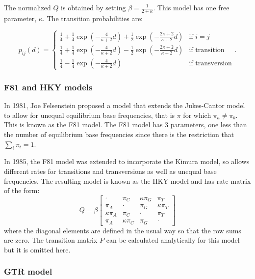 \documentclass[11pt]{article}
\begin{document}
The normalized $Q$ is obtained by setting $\beta = \frac{1}{2+\kappa}$. This model has one free parameter, $\kappa$. The transition probabilities are:

\begin{equation*}
p_{ij}(d) =  \begin{cases}
\frac{1}{4} + \frac{1}{4} \exp(-\frac{4}{\kappa+2}d) + \frac{1}{2}\exp(-\frac{2\kappa+2}{\kappa+2}d) & \text{if } i=j\\
\frac{1}{4} + \frac{1}{4} \exp(-\frac{4}{\kappa+2}d) - \frac{1}{2}\exp(-\frac{2\kappa+2}{\kappa+2}d)  &  \text{if transition}\\
\frac{1}{4} - \frac{1}{4} \exp(-\frac{4}{\kappa+2}d) &  \text{if transversion}
   \end{cases}.
\end{equation*} 


\subsubsection{F81 and HKY models}
In 1981, Joe Felsenstein proposed a model that extends the Jukes-Cantor model to allow for unequal equilibrium base frequencies, that is $\pi$ for which $\pi_a \neq \pi_b$. This is known as the F81 model.  The F81 model has 3 parameters, one less than the number of equilibrium base frequencies since there is the restriction that $\sum_i \pi_i = 1$.

In 1985, the F81 model was extended to incorporate the Kimura model, so  allows different rates for transitions and transversions as well as unequal base frequencies.  The resulting model is known as the HKY model and has rate matrix of the form:
 \begin{equation*}
Q = \beta \begin{bmatrix}
\cdot & \pi_C & \kappa\pi_G & \pi_T \\
  \pi_A & \cdot & \pi_G & \kappa\pi_T \\
  \kappa\pi_A  & \pi_C  &  \cdot & \pi_T  \\
  \pi_A & \kappa\pi_C & \pi_G & \cdot
 \end{bmatrix}
\end{equation*}
where the diagonal elements are defined in the usual way so that the row sums are zero.  The transition matrix $P$ can be calculated analytically for this model but it is omitted here.

\subsubsection{GTR model}
\end{document}
